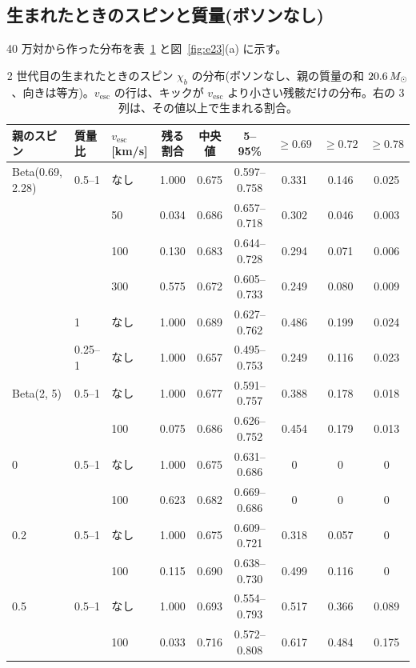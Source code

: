 \subsection{生まれたときのスピンと質量(ボソンなし)}

40 万対から作った分布を表~\ref{tab:e23dist} と図~\ref{fig:e23}(a) に示す。

\begin{table}[H]
\centering\small
\begin{tabular}{lllcccccc}
\toprule
親のスピン & 質量比 & $v_\mathrm{esc}$ [km/s] & 残る割合 & 中央値 & 5--95\% & $\ge0.69$ & $\ge0.72$ & $\ge0.78$\\
\midrule
Beta(0.69, 2.28) & 0.5--1 & なし & 1.000 & 0.675 & 0.597--0.758 & 0.331 & 0.146 & 0.025\\
 &  & 50 & 0.034 & 0.686 & 0.657--0.718 & 0.302 & 0.046 & 0.003\\
 &  & 100 & 0.130 & 0.683 & 0.644--0.728 & 0.294 & 0.071 & 0.006\\
 &  & 300 & 0.575 & 0.672 & 0.605--0.733 & 0.249 & 0.080 & 0.009\\
 & 1 & なし & 1.000 & 0.689 & 0.627--0.762 & 0.486 & 0.199 & 0.024\\
 & 0.25--1 & なし & 1.000 & 0.657 & 0.495--0.753 & 0.249 & 0.116 & 0.023\\
\midrule
Beta(2, 5) & 0.5--1 & なし & 1.000 & 0.677 & 0.591--0.757 & 0.388 & 0.178 & 0.018\\
 &  & 100 & 0.075 & 0.686 & 0.626--0.752 & 0.454 & 0.179 & 0.013\\
0 & 0.5--1 & なし & 1.000 & 0.675 & 0.631--0.686 & 0 & 0 & 0\\
 &  & 100 & 0.623 & 0.682 & 0.669--0.686 & 0 & 0 & 0\\
0.2 & 0.5--1 & なし & 1.000 & 0.675 & 0.609--0.721 & 0.318 & 0.057 & 0\\
 &  & 100 & 0.115 & 0.690 & 0.638--0.730 & 0.499 & 0.116 & 0\\
0.5 & 0.5--1 & なし & 1.000 & 0.693 & 0.554--0.793 & 0.517 & 0.366 & 0.089\\
 &  & 100 & 0.033 & 0.716 & 0.572--0.808 & 0.617 & 0.484 & 0.175\\
\bottomrule
\end{tabular}
\caption{2 世代目の生まれたときのスピン $\chi_b$ の分布(ボソンなし、親の質量の和 $20.6\,M_\odot$、向きは等方)。$v_\mathrm{esc}$ の行は、キックが $v_\mathrm{esc}$ より小さい残骸だけの分布。右の 3 列は、その値以上で生まれる割合。}
\label{tab:e23dist}
\end{table}

